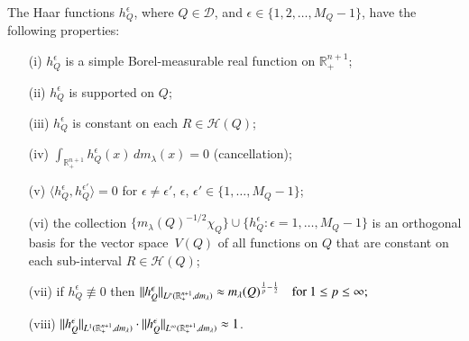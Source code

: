 \documentclass[12pt]{amsart}
\begin{document}
\begin{lemma}\label{prop:HaarFuncProp}
The Haar functions $h_{Q}^{\epsilon}$, where $Q\in\mathcal{D}$,
    and $\epsilon\in\{1,2,\ldots,M_Q - 1\}$, have the following properties:
    \begin{itemize}
        \item[(i)] $h_{Q}^{\epsilon}$ is a simple Borel-measurable
            real function on $\mathbb{R}_+^{n+1}$;
        \item[(ii)] $h_{Q}^{\epsilon}$ is supported on $Q$;
        \item[(iii)] $h_{Q}^{\epsilon}$ is constant on each
            $R\in\mathcal{H}(Q)$;
        \item[(iv)] $\int_{\mathbb{R}_+^{n+1}} h_{Q}^{\epsilon}(x)\, dm_\lambda(x)= 0$ (cancellation);
        \item[(v)] $\langle h_{Q}^{\epsilon},h_{Q}^{\epsilon'}\rangle = 0$ for
            $\epsilon \neq \epsilon'$, $\epsilon$, $\epsilon'\in\{1, \ldots, M_Q - 1\}$;
        \item[(vi)] the collection
            $
                \big\{m_\lambda(Q)^{-1/2}\chi_Q\big\}
                \cup \{h_{Q}^{\epsilon} : \epsilon = 1, \ldots, M_Q - 1\}
            $
            is an orthogonal basis for the vector
            space~$V(Q)$ of all functions on $Q$ that are
            constant on each sub-interval $R\in\mathcal{H}(Q)$;
        \item[(vii)] %
        if $h_{Q}^{\epsilon}\not\equiv 0$ then
            $
                \|h_{Q}^{\epsilon}\|_{L^p(\mathbb{R}_+^{n+1},dm_\lambda)}
                \approx m_\lambda(Q)^{\frac{1}{p} - \frac{1}{2}}
                \quad \text{for}~1 \leq p \leq \infty;
            $
        \item[(viii)] %
                \hspace{4cm}
                $\|h_{Q}^{\epsilon}\|_{L^1(\mathbb{R}_+^{n+1},dm_\lambda)}\cdot
                \|h_{Q}^{\epsilon}\|_{L^\infty(\mathbb{R}_+^{n+1},dm_\lambda)} \approx 1$.
    \end{itemize}
\end{lemma}
\end{document}
